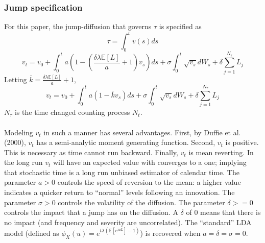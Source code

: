 \documentclass{article}
\theoremstyle{definition}
\begin{document}
\subsubsection{Jump specification}
For this paper, the jump-diffusion that governs \(\tau\) is specified as 
\begin{equation}\tau=\int_0 ^ t v(s)ds\end{equation}
\begin{equation}v_t=v_0+\int_0 ^t a\left(1-\left(\frac{\delta \lambda \mathbb{E}[L]}{a}+1\right)v_s\right)ds+\sigma \int_0 ^ t \sqrt{v_s} dW_s +\delta \sum_{j=1} ^ {N_\tau} L_j \end{equation}
 Letting \(\bar{k}=\frac{\delta \lambda \mathbb{E}[L]}{a}+1\),
\begin{equation}\label{tmc}v_t=v_0+\int_0 ^t a(1-\bar{k}v_s)ds+\sigma \int_0 ^ t \sqrt{v_s} dW_s +\delta \sum_{j=1} ^ {N_\tau} L_j \end{equation}
\(N_\tau\) is the time changed counting process \(N_t\).
\\
\\
Modeling \(v_t\) in such a manner has several advantages.  First, by Duffie et al. (2000), \(v_t\) has a semi-analytic moment generating function.  Second, \(v_t\) is positive.  This is necessary as time cannot run backward.  Finally, \(v_t\) is mean reverting.  In the long run \(v_t\) will have an expected value with converges to a one; implying that stochastic time is a long run unbiased estimator of calendar time.  The parameter \(a>0\) controls the speed of reversion to the mean: a higher value indicates a quicker return to ``normal'' levels following an innovation.  The parameter \(\sigma>0\) controls the volatility of the diffusion.  The parameter \(\delta>=0\) controls the impact that a jump has on the diffusion.  A \(\delta\) of \(0\) means that there is no impact (and frequency and severity are uncorrelated).  The ``standard'' LDA model (defined as \(\phi_X(u)=e^{t\lambda \left(\mathbb{E}\left[e^{\mathrm{i}uL}\right]-1\right)}\)) is recovered when \(a=\delta=\sigma=0\).
\end{document}

